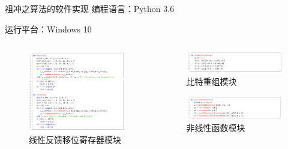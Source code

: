 \documentclass{beamer}
\begin{document}
\begin{frame}{祖冲之算法的软件实现}
编程语言：Python 3.6

运行平台：Windows 10

\begin{columns}
    \begin{column}{0.5\textwidth}
        \begin{figure}[htbp]
            \includegraphics[width=\columnwidth]{./images/python_lfsr.png}
            \caption*{线性反馈移位寄存器模块}
        \end{figure}
    \end{column}
    \begin{column}{0.5\textwidth}
        \begin{figure}[htbp]
            \includegraphics[width=\columnwidth]{./images/python_br.png}
            \caption*{比特重组模块}
        \end{figure}
        \begin{figure}[htbp]
            \includegraphics[width=\columnwidth]{./images/python_nf.png}
            \caption*{非线性函数模块}
        \end{figure}
    \end{column}
\end{columns}
\end{frame}
\end{document}
